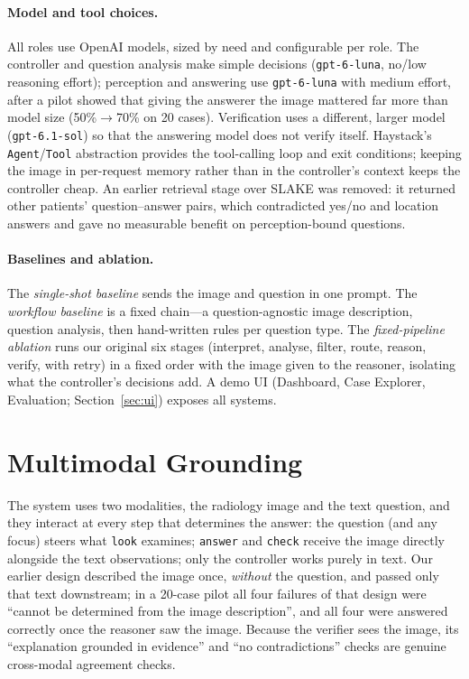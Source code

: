 \paragraph{Model and tool choices.} All roles use OpenAI models, sized by need and configurable per role. The
controller and question analysis make simple decisions (\texttt{gpt-6-luna}, no/low reasoning effort); perception
and answering use \texttt{gpt-6-luna} with medium effort, after a pilot showed that giving the answerer the image
mattered far more than model size (50\%$\to$70\% on 20 cases). Verification uses a different, larger model
(\texttt{gpt-6.1-sol}) so that the answering model does not verify itself. Haystack's \texttt{Agent}/\texttt{Tool}
abstraction provides the tool-calling loop and exit conditions; keeping the image in per-request memory rather than
in the controller's context keeps the controller cheap. An earlier retrieval stage over SLAKE was removed: it
returned other patients' question--answer pairs, which contradicted yes/no and location answers and gave no
measurable benefit on perception-bound questions.

\paragraph{Baselines and ablation.} The \emph{single-shot baseline} sends the image and question in one prompt. The
\emph{workflow baseline} is a fixed chain---a question-agnostic image description, question analysis, then
hand-written rules per question type. The \emph{fixed-pipeline ablation} runs our original six stages (interpret,
analyse, filter, route, reason, verify, with retry) in a fixed order with the image given to the reasoner, isolating
what the controller's decisions add. A demo UI (Dashboard, Case Explorer, Evaluation; Section~\ref{sec:ui}) exposes
all systems.

\section{Multimodal Grounding}
The system uses two modalities, the radiology image and the text question, and they interact at every step that
determines the answer: the question (and any focus) steers what \texttt{look} examines; \texttt{answer} and
\texttt{check} receive the image directly alongside the text observations; only the controller works purely in
text. Our earlier design described the image once, \emph{without} the question, and passed only that text downstream;
in a 20-case pilot all four failures of that design were ``cannot be determined from the image description'', and
all four were answered correctly once the reasoner saw the image. Because the verifier sees the image, its
``explanation grounded in evidence'' and ``no contradictions'' checks are genuine cross-modal agreement checks.

